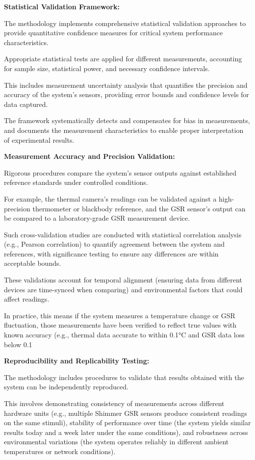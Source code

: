 \textbf{Statistical Validation Framework:}

The methodology implements comprehensive statistical validation approaches to provide quantitative confidence measures for critical system performance characteristics.

Appropriate statistical tests are applied for different measurements, accounting for sample size, statistical power, and necessary confidence intervals.

This includes measurement uncertainty analysis that quantifies the precision and accuracy of the system's sensors, providing error bounds and confidence levels for data captured.

The framework systematically detects and compensates for bias in measurements, and documents the measurement characteristics to enable proper interpretation of experimental results.

\textbf{Measurement Accuracy and Precision Validation:}

Rigorous procedures compare the system's sensor outputs against established reference standards under controlled conditions.

For example, the thermal camera's readings can be validated against a high-precision thermometer or blackbody reference, and the GSR sensor's output can be compared to a laboratory-grade GSR measurement device.

Such cross-validation studies are conducted with statistical correlation analysis (e.g., Pearson correlation) to quantify agreement between the system and references, with significance testing to ensure any differences are within acceptable bounds.

These validations account for temporal alignment (ensuring data from different devices are time-synced when comparing) and environmental factors that could affect readings.

In practice, this means if the system measures a temperature change or GSR fluctuation, those measurements have been verified to reflect true values with known accuracy (e.g., thermal data accurate to within 0.1°C and GSR data loss below 0.1%

\textbf{Reproducibility and Replicability Testing:}

The methodology includes procedures to validate that results obtained with the system can be independently reproduced.

This involves demonstrating consistency of measurements across different hardware units (e.g., multiple Shimmer GSR sensors produce consistent readings on the same stimuli), stability of performance over time (the system yields similar results today and a week later under the same conditions), and robustness across environmental variations (the system operates reliably in different ambient temperatures or network conditions).

